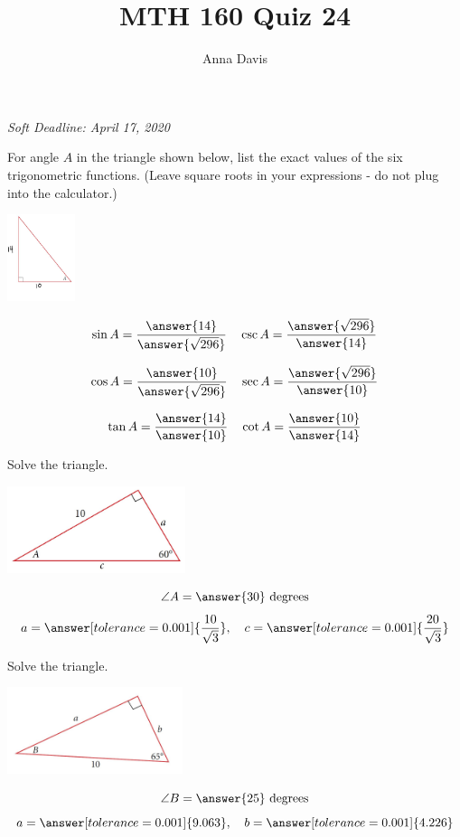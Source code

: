 \documentclass{ximera}
\author{Anna Davis} \title{MTH 160 Quiz 24}
\begin{document}
\begin{abstract}

\end{abstract}
\maketitle
 \textit{Soft Deadline: April 17, 2020}
\begin{problem}\label{prob:quiz23prob1}
For angle $A$ in the triangle shown below, list the exact values of the six trigonometric functions. (Leave square roots in your expressions - do not plug into the calculator.)
\begin{image}
   
\includegraphics[height=1in]{quiz24image3.jpg}~
 
\end{image}

$$\sin A=\frac{\answer{14}}{\answer{\sqrt{296}}}\quad \csc A=\frac{\answer{\sqrt{296}}}{\answer{14}}$$

$$\cos A=\frac{\answer{10}}{\answer{\sqrt{296}}}\quad \sec A=\frac{\answer{\sqrt{296}}}{\answer{10}}$$

$$\tan A=\frac{\answer{14}}{\answer{10}}\quad \cot A=\frac{\answer{10}}{\answer{14}}$$
\end{problem}

\begin{problem}\label{prob:quiz23prob2}
Solve the triangle.
\begin{image}
   
\includegraphics[height=1in]{quiz24image1.jpg}~
 
\end{image}

$$\angle A=\answer{30}\mbox{ degrees}$$
$$a=\answer[tolerance=0.001]{\frac{10}{\sqrt{3}}},\quad c=\answer[tolerance=0.001]{\frac{20}{\sqrt{3}}}$$
\end{problem}

\begin{problem}\label{prob:quiz23prob3}
Solve the triangle.
\begin{image}
   
\includegraphics[height=1in]{quiz24image2.jpg}~
 
\end{image}

$$\angle B=\answer{25}\mbox{ degrees}$$
$$a=\answer[tolerance=0.001]{9.063},\quad b=\answer[tolerance=0.001]{4.226}$$
\end{problem}
\end{document}
